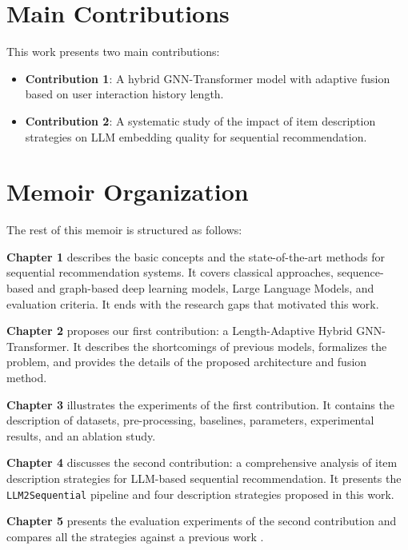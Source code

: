 \documentclass[12pt,a4paper]{report}
\begin{document}
\section*{Main Contributions}

This work presents two main contributions:

\begin{itemize}
  \item \textbf{Contribution 1}: A hybrid GNN-Transformer model with adaptive
  fusion based on user interaction history length.
  \item \textbf{Contribution 2}: A systematic study of the impact of item
  description strategies on LLM embedding quality for sequential
  recommendation.
\end{itemize}

\section*{Memoir Organization}

The rest of this memoir is structured as follows:

\medskip
\textbf{Chapter 1} describes the basic concepts and the state-of-the-art
methods for sequential recommendation systems. It covers classical approaches,
sequence-based and graph-based deep learning models, Large Language Models, and
evaluation criteria. It ends with the research gaps that motivated this work.

\textbf{Chapter 2} proposes our first contribution: a Length-Adaptive Hybrid
GNN-Transformer. It describes the shortcomings of previous models, formalizes
the problem, and provides the details of the proposed architecture and fusion
method.

\textbf{Chapter 3} illustrates the experiments of the first contribution. It
contains the description of datasets, pre-processing, baselines, parameters,
experimental results, and an ablation study.

\textbf{Chapter 4} discusses the second contribution: a comprehensive analysis
of item description strategies for LLM-based sequential recommendation. It
presents the \texttt{LLM2Sequential} pipeline and four description strategies
proposed in this work.

\textbf{Chapter 5} presents the evaluation experiments of the second
contribution and compares all the strategies against a previous work
\citep{boz2025}.
\end{document}
